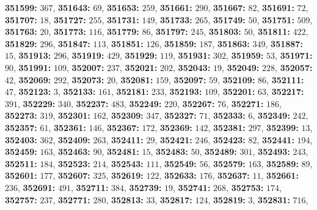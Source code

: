 \textsf{\bfseries 351599:} $367$, \textsf{\bfseries 351643:} $69$, \textsf{\bfseries 351653:} $259$, \textsf{\bfseries 351661:} $290$, \textsf{\bfseries 351667:} $82$, \textsf{\bfseries 351691:} $72$, \textsf{\bfseries 351707:} $18$, \textsf{\bfseries 351727:} $255$, \textsf{\bfseries 351731:} $149$, \textsf{\bfseries 351733:} $265$, \textsf{\bfseries 351749:} $50$, \textsf{\bfseries 351751:} $509$, \textsf{\bfseries 351763:} $20$, \textsf{\bfseries 351773:} $116$, \textsf{\bfseries 351779:} $86$, \textsf{\bfseries 351797:} $245$, \textsf{\bfseries 351803:} $50$, \textsf{\bfseries 351811:} $422$, \textsf{\bfseries 351829:} $296$, \textsf{\bfseries 351847:} $113$, \textsf{\bfseries 351851:} $126$, \textsf{\bfseries 351859:} $187$, \textsf{\bfseries 351863:} $349$, \textsf{\bfseries 351887:} $15$, \textsf{\bfseries 351913:} $296$, \textsf{\bfseries 351919:} $429$, \textsf{\bfseries 351929:} $119$, \textsf{\bfseries 351931:} $302$, \textsf{\bfseries 351959:} $53$, \textsf{\bfseries 351971:} $90$, \textsf{\bfseries 351991:} $109$, \textsf{\bfseries 352007:} $237$, \textsf{\bfseries 352021:} $202$, \textsf{\bfseries 352043:} $19$, \textsf{\bfseries 352049:} $228$, \textsf{\bfseries 352057:} $42$, \textsf{\bfseries 352069:} $292$, \textsf{\bfseries 352073:} $20$, \textsf{\bfseries 352081:} $159$, \textsf{\bfseries 352097:} $59$, \textsf{\bfseries 352109:} $86$, \textsf{\bfseries 352111:} $47$, \textsf{\bfseries 352123:} $3$, \textsf{\bfseries 352133:} $161$, \textsf{\bfseries 352181:} $233$, \textsf{\bfseries 352193:} $109$, \textsf{\bfseries 352201:} $63$, \textsf{\bfseries 352217:} $391$, \textsf{\bfseries 352229:} $340$, \textsf{\bfseries 352237:} $483$, \textsf{\bfseries 352249:} $220$, \textsf{\bfseries 352267:} $76$, \textsf{\bfseries 352271:} $186$, \textsf{\bfseries 352273:} $319$, \textsf{\bfseries 352301:} $162$, \textsf{\bfseries 352309:} $347$, \textsf{\bfseries 352327:} $71$, \textsf{\bfseries 352333:} $6$, \textsf{\bfseries 352349:} $242$, \textsf{\bfseries 352357:} $61$, \textsf{\bfseries 352361:} $146$, \textsf{\bfseries 352367:} $172$, \textsf{\bfseries 352369:} $142$, \textsf{\bfseries 352381:} $297$, \textsf{\bfseries 352399:} $13$, \textsf{\bfseries 352403:} $362$, \textsf{\bfseries 352409:} $263$, \textsf{\bfseries 352411:} $29$, \textsf{\bfseries 352421:} $246$, \textsf{\bfseries 352423:} $82$, \textsf{\bfseries 352441:} $194$, \textsf{\bfseries 352459:} $163$, \textsf{\bfseries 352463:} $90$, \textsf{\bfseries 352481:} $15$, \textsf{\bfseries 352483:} $50$, \textsf{\bfseries 352489:} $301$, \textsf{\bfseries 352493:} $243$, \textsf{\bfseries 352511:} $184$, \textsf{\bfseries 352523:} $214$, \textsf{\bfseries 352543:} $111$, \textsf{\bfseries 352549:} $56$, \textsf{\bfseries 352579:} $163$, \textsf{\bfseries 352589:} $89$, \textsf{\bfseries 352601:} $177$, \textsf{\bfseries 352607:} $325$, \textsf{\bfseries 352619:} $122$, \textsf{\bfseries 352633:} $176$, \textsf{\bfseries 352637:} $11$, \textsf{\bfseries 352661:} $236$, \textsf{\bfseries 352691:} $491$, \textsf{\bfseries 352711:} $384$, \textsf{\bfseries 352739:} $19$, \textsf{\bfseries 352741:} $268$, \textsf{\bfseries 352753:} $174$, \textsf{\bfseries 352757:} $237$, \textsf{\bfseries 352771:} $280$, \textsf{\bfseries 352813:} $33$, \textsf{\bfseries 352817:} $124$, \textsf{\bfseries 352819:} $3$, \textsf{\bfseries 352831:} $716$, 
